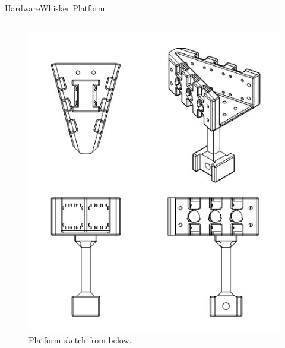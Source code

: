 \documentclass[AIRbeamer
,optEnglish
,optBiber
,optBibstyleAlphabetic
,optBeamerClassicFormat%
]{AIRlatex}
\begin{document}
    \begin{frame}[c]{Hardware}{Whisker Platform}
        \begin{column}[T]{0.5\textwidth}
            \begin{figure}[H]
                \centering
                \includegraphics[height=0.7\textheight]{figures/platform-sketch}
                \caption{Platform sketch from below.}
            \end{figure}
        \end{column}
        \begin{column}[T]{0.5\textwidth}
            \begin{figure}[H]
                \centering

\end{figure}
\end{column}
\end{frame}
\end{document}
